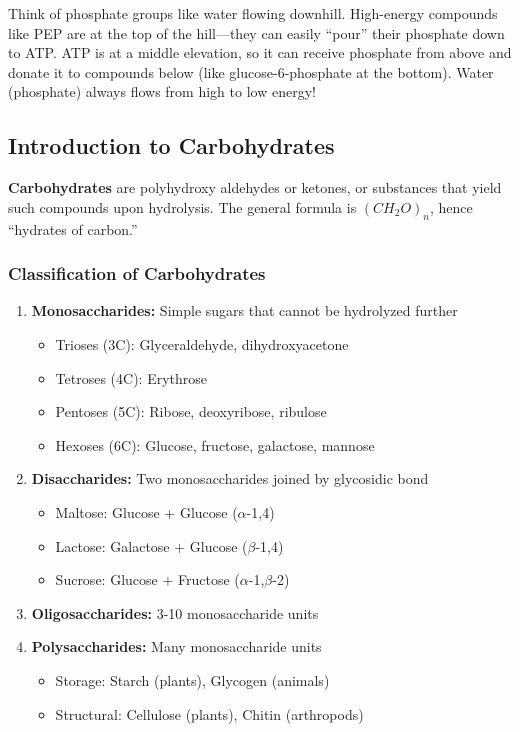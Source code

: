 \begin{analogy}
Think of phosphate groups like water flowing downhill. High-energy compounds like PEP are at the top of the hill—they can easily ``pour'' their phosphate down to ATP. ATP is at a middle elevation, so it can receive phosphate from above and donate it to compounds below (like glucose-6-phosphate at the bottom). Water (phosphate) always flows from high to low energy!
\end{analogy}

\subsection{Introduction to Carbohydrates}

\begin{definition}
\textbf{Carbohydrates} are polyhydroxy aldehydes or ketones, or substances that yield such compounds upon hydrolysis. The general formula is $(CH_2O)_n$, hence ``hydrates of carbon.''
\end{definition}

\subsubsection{Classification of Carbohydrates}

\begin{enumerate}
    \item \textbf{Monosaccharides:} Simple sugars that cannot be hydrolyzed further
    \begin{itemize}
        \item Trioses (3C): Glyceraldehyde, dihydroxyacetone
        \item Tetroses (4C): Erythrose
        \item Pentoses (5C): Ribose, deoxyribose, ribulose
        \item Hexoses (6C): Glucose, fructose, galactose, mannose
    \end{itemize}
    
    \item \textbf{Disaccharides:} Two monosaccharides joined by glycosidic bond
    \begin{itemize}
        \item Maltose: Glucose + Glucose ($\alpha$-1,4)
        \item Lactose: Galactose + Glucose ($\beta$-1,4)
        \item Sucrose: Glucose + Fructose ($\alpha$-1,$\beta$-2)
    \end{itemize}
    
    \item \textbf{Oligosaccharides:} 3-10 monosaccharide units
    
    \item \textbf{Polysaccharides:} Many monosaccharide units
    \begin{itemize}
        \item Storage: Starch (plants), Glycogen (animals)
        \item Structural: Cellulose (plants), Chitin (arthropods)
    \end{itemize}
\end{enumerate}

